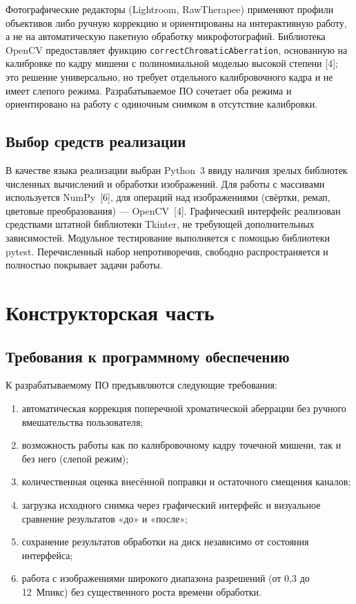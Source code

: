\documentclass[a4paper,14pt,oneside]{extreport}
\begin{document}
Фотографические редакторы (Lightroom, RawTherapee) применяют
профили объективов либо ручную коррекцию и ориентированы на
интерактивную работу, а не на автоматическую пакетную обработку
микрофотографий. Библиотека OpenCV предоставляет функцию
\texttt{correctChromaticAberration}, основанную на калибровке по кадру
мишени с полиномиальной моделью высокой степени [4]; это решение
универсально, но требует отдельного калибровочного кадра и не имеет
слепого режима. Разрабатываемое ПО сочетает оба режима и ориентировано
на работу с одиночным снимком в отсутствие калибровки.

\subsection{Выбор средств реализации}

В качестве языка реализации выбран Python~3 ввиду наличия зрелых
библиотек численных вычислений и обработки изображений. Для работы с
массивами используется NumPy~[6], для операций над изображениями
(свёртки, ремап, цветовые преобразования) — OpenCV~[4]. Графический
интерфейс реализован средствами штатной библиотеки
Tkinter, не требующей дополнительных зависимостей. Модульное тестирование
выполняется с помощью библиотеки pytest. Перечисленный набор
непротиворечив, свободно распространяется и полностью покрывает задачи
работы.

\clearpage
\section{Конструкторская часть}

\subsection{Требования к программному обеспечению}

К разрабатываемому ПО предъявляются следующие требования:
\begin{enumerate}
\item автоматическая коррекция поперечной хроматической аберрации без
ручного вмешательства пользователя;
\item возможность работы как по калибровочному кадру точечной мишени, так
и без него (слепой режим);
\item количественная оценка внесённой поправки и остаточного смещения
каналов;
\item загрузка исходного снимка через графический интерфейс и визуальное
сравнение результатов «до» и «после»;
\item сохранение результатов обработки на диск независимо от состояния
интерфейса;
\item работа с изображениями широкого диапазона разрешений
(от 0,3 до 12~Мпикс) без существенного роста времени обработки.
\end{enumerate}
\end{document}
